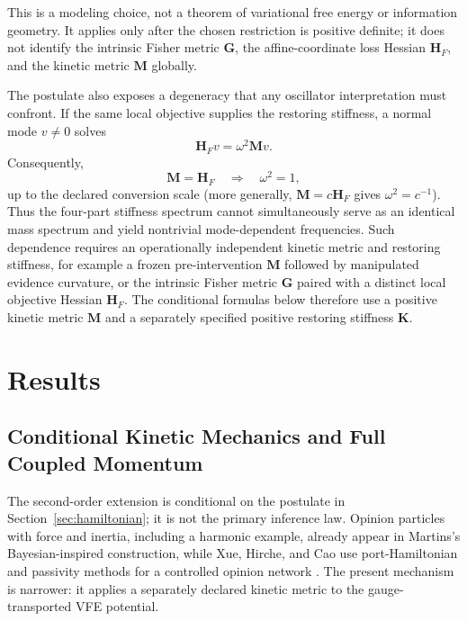 \documentclass[12pt]{article}
\begin{document}
This is a modeling choice, not a theorem of variational free energy or information geometry.  It applies only after the chosen restriction is positive definite; it does not identify the intrinsic Fisher metric $\mathbf G$, the affine-coordinate loss Hessian $\mathbf H_F$, and the kinetic metric $\mathbf M$ globally.

The postulate also exposes a degeneracy that any oscillator interpretation must confront.  If the same local objective supplies the restoring stiffness, a normal mode $v\ne0$ solves
\begin{equation}
\mathbf H_Fv=\omega^2\mathbf Mv.
\label{eq:hessian_mass_spectrum}
\end{equation}
Consequently,
\begin{equation}
\boxed{
\mathbf M=\mathbf H_F
\quad\Longrightarrow\quad
\omega^2=1,}
\label{eq:hessian_mass_degeneracy}
\end{equation}
up to the declared conversion scale (more generally, $\mathbf M=c\mathbf H_F$ gives $\omega^2=c^{-1}$).  Thus the four-part stiffness spectrum cannot simultaneously serve as an identical mass spectrum and yield nontrivial mode-dependent frequencies.  Such dependence requires an operationally independent kinetic metric and restoring stiffness, for example a frozen pre-intervention $\mathbf M$ followed by manipulated evidence curvature, or the intrinsic Fisher metric $\mathbf G$ paired with a distinct local objective Hessian $\mathbf H_F$.  The conditional formulas below therefore use a positive kinetic metric $\mathbf M$ and a separately specified positive restoring stiffness $\mathbf K$.

\section{Results}

\subsection{Conditional Kinetic Mechanics and Full Coupled Momentum}
\label{sec:cognitive-momentum}

The second-order extension is conditional on the postulate in Section~\ref{sec:hamiltonian}; it is not the primary inference law.  Opinion particles with force and inertia, including a harmonic example, already appear in Martins's Bayesian-inspired construction, while Xue, Hirche, and Cao use port-Hamiltonian and passivity methods for a controlled opinion network \citep{Martins2015OpinionParticles,XueHircheCao2020}.  The present mechanism is narrower: it applies a separately declared kinetic metric to the gauge-transported VFE potential.
\end{document}
